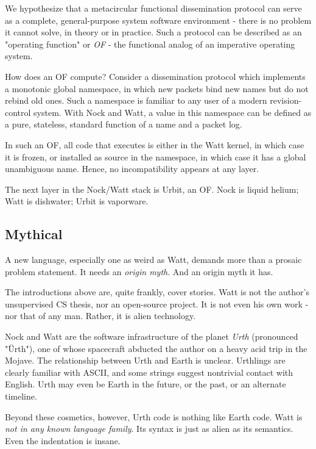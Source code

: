 \documentclass[10pt, nocopyrightspace]{sigplanconf}
\begin{document}
We hypothesize that a metacircular functional dissemination
protocol can serve as a complete, general-purpose system software
environment - there is no problem it cannot solve, in theory or
in practice.  Such a
protocol can be described as an "operating function" or \emph{OF} -
the functional analog of an imperative operating system.  

How does an OF compute?  Consider a dissemination protocol which
implements a monotonic global namespace, in which new packets
bind new names but do not rebind old ones.  Such a namespace is
familiar to any user of a modern revision-control system.  With
Nock and Watt, a value in this namespace can be defined as a
pure, stateless, standard function of a name and a packet log.

In such an OF, all code that executes is either in the Watt
kernel, in which case it is frozen, or installed as source in the
namespace, in which case it has a global unambiguous name.
Hence, no incompatibility appears at any layer.

The next layer in the Nock/Watt stack is Urbit, an OF.  Nock is
liquid helium; Watt is dishwater; Urbit is vaporware.

\subsection{Mythical}

A new language, especially one as weird as Watt, demands more
than a prosaic problem statement.  It needs an \emph{origin myth}.  And
an origin myth it has.

The introductions above are, quite frankly, cover stories.  Watt
is not the author's unsupervised CS thesis, nor an open-source
project.  It is not even his own work - nor that of any man.
Rather, it is alien technology.

Nock and Watt are the software infrastructure of the planet
\emph{Urth}
(pronounced "\"Urth"), one of whose spacecraft abducted the author
on a heavy acid trip in the Mojave.  The relationship between
Urth and Earth is unclear.  Urthlings are clearly familiar with
ASCII, and some strings suggest nontrivial contact with English.
Urth may even be Earth in the future, or the past, or an
alternate timeline.

Beyond these cosmetics, however, Urth code is nothing like Earth
code.  Watt is \emph{not in any known language family}.  Its syntax is
just as alien as its semantics.  Even the indentation is insane.
\end{document}
